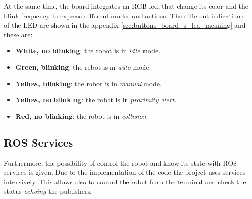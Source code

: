 	At the same time, the board integrates an RGB led, that change its color and the blink frequency to express different modes and actions.
	The different indications of the LED are shown in the appendix \ref{sec:buttons_board_s_led_meaning} and these are:
	\begin{itemize}
		\item \textbf{White, no blinking}: the robot is in \emph{idle} mode.
		\item \textbf{Green, blinking}: the robot is in \emph{auto} mode.
		\item \textbf{Yellow, blinking}: the robot is in \emph{manual} mode.
		\item \textbf{Yellow, no blinking}: the robot is in \emph{proximity alert}.
		\item \textbf{Red, no blinking}: the robot is in \emph{collision}.
	\end{itemize}

	\subsection{ROS Services} %
	\label{sub:mr_ros_services}
	Furthermore, the possibility of control the robot and know its state with ROS services is given.
	Due to the implementation of the code the project uses services intensively.
	This allows also to control the robot from the terminal and check the status \emph{echoing} the publishers.


